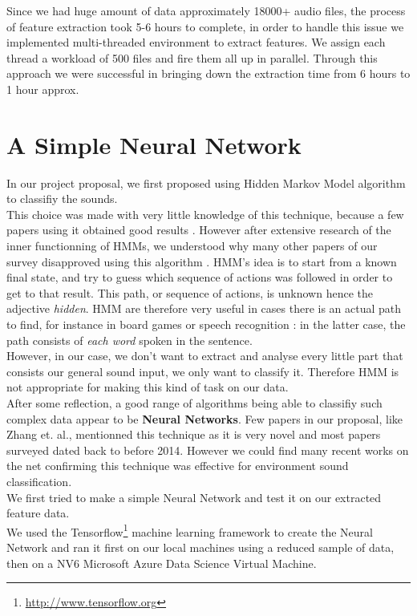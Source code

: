 \documentclass{article} %
\begin{document}
        Since we had huge amount of data approximately 18000+ audio files, the process of feature extraction took 5-6 hours to complete, in order to handle this issue we implemented multi-threaded environment to extract features. We assign each thread a workload of 500 files and fire them all up in parallel. Through this approach we were successful in bringing down the extraction time from 6 hours to 1 hour approx.

\section{A Simple Neural Network}
		In our project proposal, we first proposed using Hidden Markov Model algorithm to classifiy the sounds.\\
		\newline
		This choice was made with very little knowledge of this technique, because a few papers using it obtained good results \cite{cite3} \cite{cite4}. However after extensive research of the inner functionning of HMMs, we understood why many other papers of our survey disapproved using this algorithm \cite{cite5} \cite{cite6}. HMM's idea is to start from a known final state, and try to guess which sequence of actions was followed in order to get to that result. This path, or sequence of actions, is unknown hence the adjective \emph{hidden}. HMM are therefore very useful in cases there is an actual path to find, for instance in board games or speech recognition : in the latter case, the path consists of \emph{each word} spoken in the sentence.\\
		\newline
		However, in our case, we don't want to extract and analyse every little part that consists our general sound input, we only want to classify it. Therefore HMM is not appropriate for making this kind of task on our data.\\
		\newline
		After some reflection, a good range of algorithms being able to classifiy such complex data appear to be \textbf{Neural Networks}. Few papers in our proposal, like Zhang et. al.\cite{cite6}, mentionned this technique as it is very novel and most papers surveyed dated back to before 2014. However we could find many recent works on the net confirming this technique was effective for environment sound classification.\\
		\newline
		We first tried to make a simple Neural Network and test it on our extracted feature data.\\
        \newline
		We used the Tensorflow\footnote{\url{http://www.tensorflow.org}} machine learning framework to create the Neural Network and ran it first on our local machines using a reduced sample of data, then on a NV6 Microsoft Azure Data Science Virtual Machine.
\end{document}

